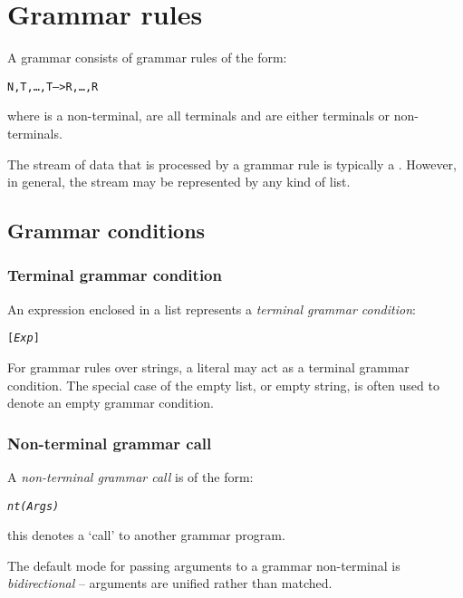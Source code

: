 \chapter{Grammar rules}
\label{grammars}

A \go grammar consists of grammar rules of the form:
\begin{alltt}
N,T,\ldots,T\subn --> R,\ldots,R
\end{alltt}
where  is a non-terminal,  are all terminals and  are either terminals or non-terminals.

The stream of data that is processed by a grammar rule is typically a . However, in general, the stream may be represented by any kind of list.

\section{Grammar conditions}

\subsection{Terminal grammar condition}
\label{grammar:terminal}

An expression enclosed in a list represents a \emph{terminal grammar condition}:
\begin{alltt}
[\emph{Exp}]
\end{alltt}
For grammar rules over strings, a  literal may act as a terminal grammar condition. The special case of the empty list, or empty string, is often used to denote an empty grammar condition.

\subsection{Non-terminal grammar call}
\label{grammar:nonterminal}

A \emph{non-terminal grammar call} is of the form:
\begin{alltt}
\emph{nt(Args)}
\end{alltt}
this denotes a `call' to another grammar program.

The default mode for passing arguments to a grammar non-terminal is \emph{bidirectional} -- arguments are unified rather than matched.

